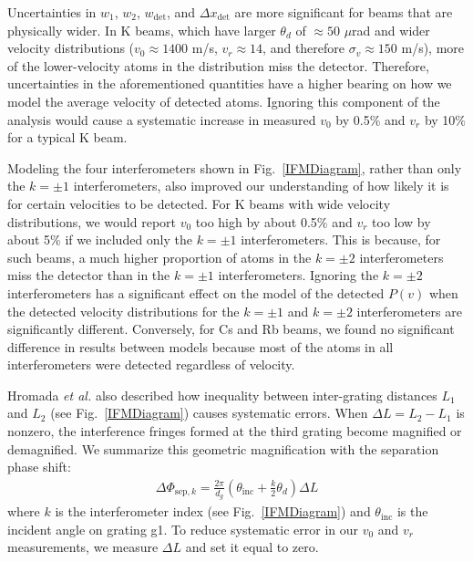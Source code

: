 \documentclass[twocolumn,pra,showpacs,superscriptaddress,longbibliography]{revtex4-1}   %
\newcommand{\figref}[1]{Fig.~\ref{#1}}
\newcommand{\dphisepk}{\Delta\Phi_{\mathrm{sep},k}}
\newcommand{\etalspace}{\textit{et al. }}
\begin{document}
Uncertainties in $w_1$, $w_2$, $w_{\mathrm{det}}$, and $\Delta x_{\mathrm{det}}$ are more significant for beams that are physically wider. 
In K beams, which have larger $\theta_d$ of $\approx 50$ $\mu$rad and wider velocity distributions 
($v_0 \approx 1400$ m/s, $v_r \approx 14$, and therefore $\sigma_v \approx 150$ m/s), more of the lower-velocity atoms in the distribution miss the detector. Therefore, uncertainties in the aforementioned quantities have a higher bearing on how we model the average velocity of detected atoms.
Ignoring this component of the analysis would cause a systematic increase in measured $v_0$ by 0.5\% and $v_r$ by 10\% for a typical K beam.

Modeling the four interferometers shown in \figref{IFMDiagram}, rather than only the $k=\pm1$ interferometers, also improved our understanding of how likely it is for certain velocities to be detected. For K beams with wide velocity distributions, 
we would report $v_0$ too high by about 0.5\% and $v_r$ too low by about 5\% if we included only the $k=\pm 1$ interferometers.
This is because, for such beams, a much higher proportion of atoms in the $k=\pm2$ interferometers miss the detector than in the $k=\pm1$ interferometers. 
Ignoring the $k=\pm 2$ interferometers has a significant effect on the model of the detected $P(v)$ when the detected velocity distributions for the $k=\pm1$ and $k=\pm2$ interferometers are significantly different.
Conversely, for Cs and Rb beams, we found no significant difference in results between models because most of the atoms in all interferometers were detected regardless of velocity.

Hromada \etalspace \cite{Hromada2014} also described how inequality between inter-grating distances $L_1$ and $L_2$ (see \figref{IFMDiagram}) causes systematic errors. 
When $\Delta L = L_2 - L_1$ is nonzero, the interference fringes formed at the third grating become magnified or demagnified.
We summarize this geometric magnification with the separation phase shift:
\begin{align}
	\dphisepk = \frac{2\pi}{d_g}
	\left(
		\theta_{\mathrm{inc}} + \frac{k}{2}\theta_d
	\right) \Delta L
	\label{phiSep}
\end{align}
where $k$ is the interferometer index (see \figref{IFMDiagram}) and $\theta_{\mathrm{inc}}$ is the incident angle on grating g1. 
To reduce systematic error in our $v_0$ and $v_r$ measurements, 
we measure $\Delta L$ and set it equal to zero.
\end{document}
